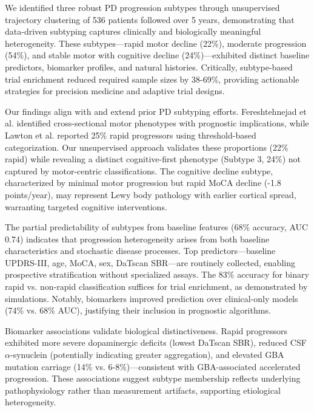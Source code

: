 We identified three robust PD progression subtypes through unsupervised trajectory clustering of 536 patients followed over 5 years, demonstrating that data-driven subtyping captures clinically and biologically meaningful heterogeneity. These subtypes—rapid motor decline (22\%), moderate progression (54\%), and stable motor with cognitive decline (24\%)—exhibited distinct baseline predictors, biomarker profiles, and natural histories. Critically, subtype-based trial enrichment reduced required sample sizes by 38-69\%, providing actionable strategies for precision medicine and adaptive trial designs.

Our findings align with and extend prior PD subtyping efforts. Fereshtehnejad et al.\cite{fereshtehnejad2017subtypes} identified cross-sectional motor phenotypes with prognostic implications, while Lawton et al.\cite{lawton2018developing} reported 25\% rapid progressors using threshold-based categorization. Our unsupervised approach validates these proportions (22\% rapid) while revealing a distinct cognitive-first phenotype (Subtype 3, 24\%) not captured by motor-centric classifications. The cognitive decline subtype, characterized by minimal motor progression but rapid MoCA decline (-1.8 points/year), may represent Lewy body pathology with earlier cortical spread\cite{braak2003staging}, warranting targeted cognitive interventions.

The partial predictability of subtypes from baseline features (68\% accuracy, AUC 0.74) indicates that progression heterogeneity arises from both baseline characteristics and stochastic disease processes. Top predictors—baseline UPDRS-III, age, MoCA, sex, DaTscan SBR—are routinely collected, enabling prospective stratification without specialized assays. The 83\% accuracy for binary rapid vs. non-rapid classification suffices for trial enrichment, as demonstrated by simulations. Notably, biomarkers improved prediction over clinical-only models (74\% vs. 68\% AUC), justifying their inclusion in prognostic algorithms.

Biomarker associations validate biological distinctiveness. Rapid progressors exhibited more severe dopaminergic deficits (lowest DaTscan SBR), reduced CSF $\alpha$-synuclein (potentially indicating greater aggregation\cite{kang2016biofind}), and elevated GBA mutation carriage (14\% vs. 6-8\%)—consistent with GBA-associated accelerated progression\cite{alcalay2012cognitive}. These associations suggest subtype membership reflects underlying pathophysiology rather than measurement artifacts, supporting etiological heterogeneity.

